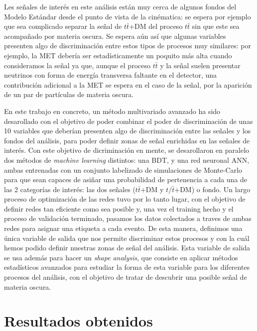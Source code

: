 \documentclass[a4paper, 10pt, openright]{report}
\begin{document}
\begin{appendices}
Les se\~{n}ales de inter\'{e}s en este an\'{a}lisis est\'{a}n muy cerca de algunos fondos del Modelo Est\'{a}ndar desde el punto de vista de la cin\'{e}matica: se espera por ejemplo que sea complicado separar la se\~{n}al de $t \bar t$+DM del proceso $t \bar t$ sin que este sea acompa\~{n}ado por materia oscura. Se espera a\'{u}n as\'{i} que algunas variables presenten algo de discriminaci\'{o}n entre estos tipos de procesos muy similares: por ejemplo, la \ac{MET} deber\'{i}a ser estad\'{i}sticamente un poquito m\'{a}s alta cuando consideramos la se\~{n}al ya que, aunque el proceso $t \bar t$ y la se\~{n}al suelen presentar neutrinos con forma de energ\'{i}a transversa faltante en el detector, una contribuci\'{o}n adicional a la \ac{MET} se espera en el caso de la se\~{n}al, por la aparici\'{o}n de un par de part\'{i}culas de materia oscura.

En este trabajo en concreto, un m\'{e}todo multivariado avanzado ha sido desarollado con el objetivo de poder combinar el poder de discriminaci\'{o}n de unas 10 variables que deber\'{i}an presenten algo de discriminaci\'{o}n entre las se\~{n}ales y los fondos del an\'{a}lisis, para poder definir zonas de se\~{n}al enrichidas en las se\~{n}ales de inter\'{e}s. Con este objetivo de dicriminaci\'{o}n en mente, se desarollaron en paralelo dos m\'{e}todos de \textit{machine learning} distintos: una \ac{BDT}, y una red neuronal \ac{ANN}, ambas entrenadas con un conjunto labelizado de simulaciones de Monte-Carlo para que sean capaces de asi\~{n}ar una probabilidad de pertenencia a cada una de las 2 categor\'{i}as de inter\'{e}s: las dos se\~{n}ales ($t \bar t$+DM y $t/\bar t$+DM) o fondo. Un largo proceso de optimizaci\'{o}n de las redes tuvo por lo tanto lugar, con el objetivo de definir redes tan eficiente como sea posible y, una vez el training hecho y el proceso de validaci\'{o}n terminado, pasamos los datos colectados a traves de ambas redes para asignar una etiqueta a cada evento. De esta manera, definimos una \'{u}nica variable de salida que nos permite discriminar estos procesos y con la cu\'{a}l hemos podido definir nuestras zonas de se\~{n}al del an\'{a}lisis. Esta variable de salida se usa adem\'{a}s para hacer un \textit{shape analysis}, que consiste en aplicar m\'{e}todos estad\'{i}sticos avanzados para estudiar la forma de esta variable para los diferentes procesos del an\'{a}lisis, con el objetivo de tratar de descubrir una posible se\~{n}al de materia oscura.

\section{Resultados obtenidos}


\end{appendices}
\end{document}
